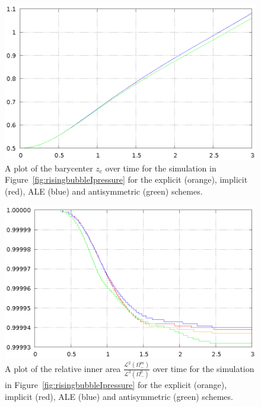 \documentclass[a4paper,12pt,onecolumn]{article}
\begin{document}
\begin{figure}[htbp]
\centering
\includegraphics[width=.45\textwidth]
{figures/rising_bubble_I_barycenter.ps}
\caption[Navier--Stokes rising bubble I barycenter]
{A plot of the barycenter $z_c$ over time for the simulation in
Figure~\ref{fig:risingbubbleIpressure} for the explicit (orange), implicit
(red), ALE (blue) and antisymmetric (green) schemes.}
\label{fig:risingbubbleIbarycenter}
\end{figure}

\begin{figure}[htbp]
\centering
\includegraphics[width=.45\textwidth]
{figures/rising_bubble_I_inner_volume.ps}
\caption[Navier--Stokes rising bubble I inner area]
{A plot of the relative inner area
$\frac{\mathcal{L}^2(\Omega^m_-)}{\mathcal{L}^2(\Omega^0_-)}$ over time for the
simulation in Figure~\ref{fig:risingbubbleIpressure} for the explicit
(orange), implicit (red), ALE (blue) and antisymmetric (green) schemes.}
\label{fig:risingbubbleIinnervolume}
\end{figure}
\end{document}
